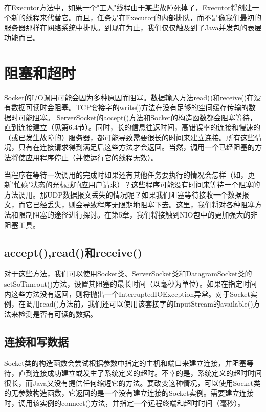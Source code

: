 		

		在Executor方法中，如果一个"工人"线程由于某些故障死掉了，Executor将创建一个新的线程来代替它。而且，任务是在Executor的内部排队，而不是像我们最初的服务器那样在网络系统中排队。到现在为止，我们仅仅触及到了Java并发包的表层功能而已。 

\section{阻塞和超时}

	Socket的I/O调用可能会因为多种原因而阻塞。数据输入方法read()和receive()在没有数据可读时会阻塞。TCP套接字的write()方法在没有足够的空间缓存传输的数据时可能阻塞。 ServerSocket的accept()方法和Socket的构造函数都会阻塞等待，直到连接建立（见第6.4节）。同时，长的信息往返时间，高错误率的连接和慢速的（或已发生故障的）服务器，都可能导致需要很长的时间来建立连接。所有这些情况，只有在连接请求得到满足后这些方法才会返回。当然，调用一个已经阻塞的方法将使应用程序停止（并使运行它的线程无效）。 

	当程序在等待一次调用的完成时如果还有其他任务要执行的情况会怎样（如，更新"忙碌"状态的光标或响应用户请求）？这些程序可能没有时间来等待一个阻塞的方法调用。那UDP数据报文丢失的情况呢？如果我们阻塞等待接收一个数据报文，而它已经丢失，则会导致程序无限期地阻塞下去。这里，我们将对各种阻塞方法和限制阻塞的途径进行探讨。在第5章，我们将接触到NIO包中的更加强大的非阻塞工具。 

	\subsection{accept(),read()和receive()} 

		对于这些方法，我们可以使用Socket类、ServerSocket类和DatagramSocket类的setSoTimeout()方法，设置其阻塞的最长时间（以毫秒为单位）。如果在指定时间内这些方法没有返回，则将抛出一个InterruptedIOException异常。对于Socket实例，在调用read()方法前，我们还可以使用该套接字的InputStream的available()方法来检测是否有可读的数据。 

	\subsection{连接和写数据}

		Socket类的构造函数会尝试根据参数中指定的主机和端口来建立连接，并阻塞等待，直到连接成功建立或发生了系统定义的超时。不幸的是，系统定义的超时时间很长，而Java又没有提供任何缩短它的方法。要改变这种情况，可以使用Socket类的无参数构造函数，它返回的是一个没有建立连接的Socket实例。需要建立连接时，调用该实例的connect()方法，并指定一个远程终端和超时时间（毫秒）。 

